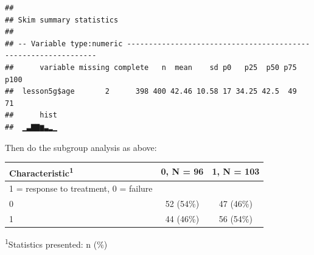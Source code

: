 \documentclass[]{book}
\newenvironment{Shaded}{\begin{snugshade}}{\end{snugshade}}
\newcommand{\CommentTok}[1]{\textcolor[rgb]{0.56,0.35,0.01}{\textit{#1}}}
\newcommand{\DataTypeTok}[1]{\textcolor[rgb]{0.13,0.29,0.53}{#1}}
\newcommand{\DecValTok}[1]{\textcolor[rgb]{0.00,0.00,0.81}{#1}}
\newcommand{\FloatTok}[1]{\textcolor[rgb]{0.00,0.00,0.81}{#1}}
\newcommand{\KeywordTok}[1]{\textcolor[rgb]{0.13,0.29,0.53}{\textbf{#1}}}
\newcommand{\NormalTok}[1]{#1}
\newcommand{\OperatorTok}[1]{\textcolor[rgb]{0.81,0.36,0.00}{\textbf{#1}}}
\newcommand{\StringTok}[1]{\textcolor[rgb]{0.31,0.60,0.02}{#1}}
\begin{document}
\begin{verbatim}
## 
## Skim summary statistics
## 
## -- Variable type:numeric ---------------------------------------------------------------
##      variable missing complete   n  mean    sd p0   p25  p50 p75 p100
##  lesson5g$age       2      398 400 42.46 10.58 17 34.25 42.5  49   71
##      hist
##  ▁▃▇▇▆▃▂▁
\end{verbatim}

\begin{Shaded}
\end{Shaded}

Then do the subgroup analysis as above:

\begin{Shaded}
\end{Shaded}

\captionsetup[table]{labelformat=empty,skip=1pt}
\begin{longtable}{lcc}
\toprule
\textbf{Characteristic}\textsuperscript{1} & \textbf{0}, N = 96 & \textbf{1}, N = 103 \\ 
\midrule
1 = response to treatment, 0 = failure &  &  \\ 
0 & 52 (54\%) & 47 (46\%) \\ 
1 & 44 (46\%) & 56 (54\%) \\ 
\bottomrule
\end{longtable}
\vspace{-5mm}
\begin{minipage}{\linewidth}
\textsuperscript{1}Statistics presented: n (\%) \\ 
\end{minipage}
\end{document}
